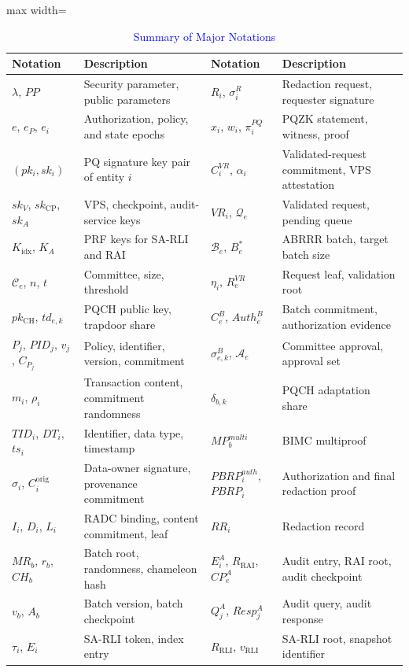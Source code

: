 \documentclass[lettersize,journal]{IEEEtran}
\begin{document}
\begin{table}[t]
\centering
\caption{\textcolor{blue}{Summary of Major Notations}}
\label{tab:notation}
\color{blue}
\scriptsize
\renewcommand{\arraystretch}{1.12}
\setlength{\tabcolsep}{4pt}
\begin{adjustbox}{max width=\textwidth}
\begin{tabular}{@{}ll@{\quad}ll@{}}
\hline
\textbf{Notation} & \textbf{Description} & \textbf{Notation} & \textbf{Description}\\
\hline
$\lambda$, $PP$ & Security parameter, public parameters &
$R_i$, $\sigma_i^R$ & Redaction request, requester signature\\
$e$, $e_P$, $e_i$ & Authorization, policy, and state epochs &
$x_i$, $w_i$, $\pi_i^{PQ}$ & PQZK statement, witness, proof\\
$(pk_i,sk_i)$ & PQ signature key pair of entity $i$ &
$C_i^{VR}$, $\alpha_i$ & Validated-request commitment, VPS attestation\\
$sk_V$, $sk_{\mathrm{CP}}$, $sk_A$ & VPS, checkpoint, audit-service keys &
$VR_i$, $\mathcal{Q}_e$ & Validated request, pending queue\\
$K_{\mathrm{idx}}$, $K_A$ & PRF keys for SA-RLI and RAI &
$\mathcal{B}_e$, $B_e^{*}$ & ABRRR batch, target batch size\\
$\mathcal{C}_e$, $n$, $t$ & Committee, size, threshold &
$\eta_i$, $R_e^{VR}$ & Request leaf, validation root\\
$pk_{\mathrm{CH}}$, $td_{e,k}$ & PQCH public key, trapdoor share &
$C_e^B$, $Auth_e^B$ & Batch commitment, authorization evidence\\
$P_j$, $PID_j$, $v_j$, $C_{P_j}$ & Policy, identifier, version, commitment &
$\sigma_{e,k}^B$, $\mathcal{A}_e$ & Committee approval, approval set\\
$m_i$, $\rho_i$ & Transaction content, commitment randomness &
$\delta_{b,k}$ & PQCH adaptation share\\
$TID_i$, $DT_i$, $ts_i$ & Identifier, data type, timestamp &
$MP_b^{multi}$ & BIMC multiproof\\
$\sigma_i$, $C_i^{\mathrm{orig}}$ & Data-owner signature, provenance commitment &
$PBRP_i^{auth}$, $PBRP_i$ & Authorization and final redaction proof\\
$I_i$, $D_i$, $L_i$ & RADC binding, content commitment, leaf &
$RR_i$ & Redaction record\\
$MR_b$, $r_b$, $CH_b$ & Batch root, randomness, chameleon hash &
$E_i^A$, $R_{\mathrm{RAI}}$, $CP_e^A$ & Audit entry, RAI root, audit checkpoint\\
$v_b$, $A_b$ & Batch version, batch checkpoint &
$Q_j^A$, $Resp_j^A$ & Audit query, audit response\\
$\tau_i$, $E_i$ & SA-RLI token, index entry &
$R_{\mathrm{RLI}}$, $v_{\mathrm{RLI}}$ & SA-RLI root, snapshot identifier\\
\hline
\end{tabular}
\end{adjustbox}
\end{table}
\end{document}
